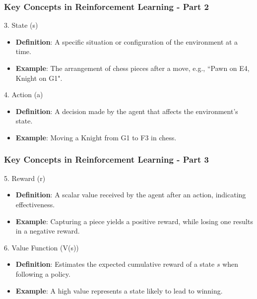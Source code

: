 \documentclass{beamer}
\begin{document}
\begin{frame}[fragile]
    \frametitle{Key Concepts in Reinforcement Learning - Part 2}
    \begin{block}{3. State (s)}
        \begin{itemize}
            \item \textbf{Definition}: A specific situation or configuration of the environment at a time.
            \item \textbf{Example}: The arrangement of chess pieces after a move, e.g., ``Pawn on E4, Knight on G1".
        \end{itemize}
    \end{block}

    \begin{block}{4. Action (a)}
        \begin{itemize}
            \item \textbf{Definition}: A decision made by the agent that affects the environment's state.
            \item \textbf{Example}: Moving a Knight from G1 to F3 in chess.
        \end{itemize}
    \end{block}
\end{frame}

\begin{frame}[fragile]
    \frametitle{Key Concepts in Reinforcement Learning - Part 3}
    \begin{block}{5. Reward (r)}
        \begin{itemize}
            \item \textbf{Definition}: A scalar value received by the agent after an action, indicating effectiveness.
            \item \textbf{Example}: Capturing a piece yields a positive reward, while losing one results in a negative reward.
        \end{itemize}
    \end{block}

    \begin{block}{6. Value Function (V(s))}
        \begin{itemize}
            \item \textbf{Definition}: Estimates the expected cumulative reward of a state \(s\) when following a policy.
            \item \textbf{Example}: A high value represents a state likely to lead to winning.
        \end{itemize}
    \end{block}
\end{frame}
\end{document}
